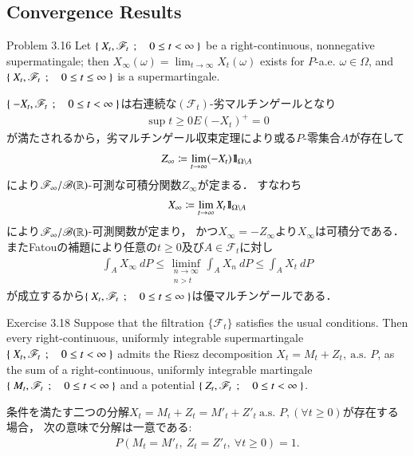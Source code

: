 \subsection{Convergence Results}
	\begin{itembox}[l]{Problem 3.16}
		Let $\left\{\ X_t,\mathscr{F}_t\ \, ; \quad 0 \leq t < \infty\ \right\}$ be a right-continuous, nonnegative
		supermatingale; then $X_\infty(\omega) = \lim_{t \to \infty} X_t(\omega)$ exists for
		$P$-a.e. $\omega \in \Omega$, and $\left\{\ X_t,\mathscr{F}_t\ \, ; \quad 0 \leq t \leq \infty\ \right\}$ is a supermartingale.
	\end{itembox}
	
	\begin{prf}
		$\left\{\ -X_t,\mathscr{F}_t\ \, ; \quad 0 \leq t < \infty\ \right\}$は右連続な$(\mathscr{F}_t)$-劣マルチンゲールとなり
		\begin{align}
			\sup{t \geq 0}{E(-X_t)^+} = 0
		\end{align}
		が満たされるから，劣マルチンゲール収束定理により或る$P$-零集合$A$が存在して
		\begin{align}
			Z_\infty \coloneqq \lim_{t \to \infty} (-X_t)\mbox{1}\hspace{-0.25em}\mbox{l}_{\Omega \backslash A}
		\end{align}
		により$\mathscr{F}_\infty/\mathscr{B}(\mathbb{R})$-可測な可積分関数$Z_\infty$が定まる．
		すなわち
		\begin{align}
			X_\infty \coloneqq \lim_{t \to \infty} X_t\mbox{1}\hspace{-0.25em}\mbox{l}_{\Omega \backslash A}
		\end{align}
		により$\mathscr{F}_\infty/\mathscr{B}(\mathbb{R})$-可測関数が定まり，
		かつ$X_\infty = -Z_\infty$より$X_\infty$は可積分である．
		またFatouの補題により任意の$t \geq 0$及び$A \in \mathscr{F}_t$に対し
		\begin{align}
			\int_A X_\infty\ dP \leq \liminf_{\substack{n \to \infty \\ n > t}} \int_A X_n\ dP \leq \int_A X_t\ dP
		\end{align}
		が成立するから$\left\{\ X_t,\mathscr{F}_t\ \, ; \quad 0 \leq t \leq \infty\ \right\}$は優マルチンゲールである．
		\QED
	\end{prf}
	
	\begin{itembox}[l]{Exercise 3.18}
		Suppose that the filtration $\{\mathscr{F}_t\}$ satisfies the usual conditions.
		Then every right-continuous, uniformly integrable supermartingale $\left\{\ X_t,\mathscr{F}_t\ \, ; \quad 0 \leq t < \infty\ \right\}$
		admits the Riesz decomposition $X_t = M_t + Z_t,\ \mbox{a.s. $P$}$, as the sum
		of a right-continuous, uniformly integrable martingale $\left\{\ M_t,\mathscr{F}_t\ \, ; \quad 0 \leq t < \infty\ \right\}$
		and a potential $\left\{\ Z_t,\mathscr{F}_t\ \, ; \quad 0 \leq t < \infty\ \right\}$.
 	\end{itembox}
 	条件を満たす二つの分解$X_t = M_t + Z_t = M'_t + Z'_t\ \mbox{a.s. $P$}, (\forall t \geq 0)$が存在する場合，
 	次の意味で分解は一意である:
 	\begin{align}
 		P \left( M_t = M'_t,\ Z_t = Z'_t,\ \forall t \geq 0 \right) = 1.
 		\label{eq:chapter_1_Exercise_3_18_4}
 	\end{align}
 	
